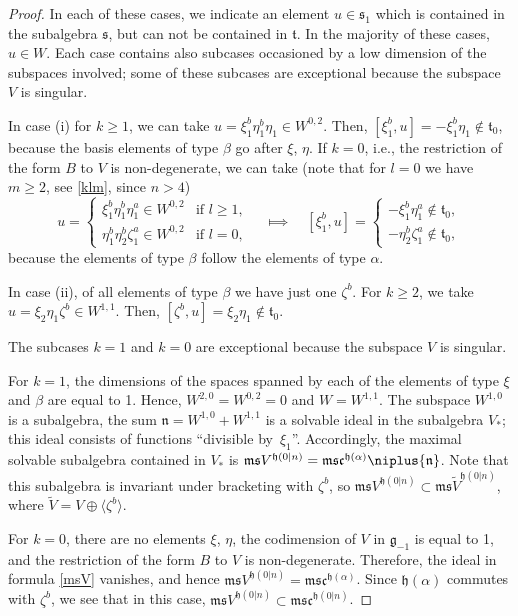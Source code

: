 \documentclass[10pt,a4paper]{amsart}
\newcommand {\fc} {{\mathfrak{c}}}
\newcommand {\fg} {{\mathfrak{g}}} %
\newcommand {\fh} {{\mathfrak{h}}}
\newcommand {\fm} {{\mathfrak{m}}}
\newcommand {\fn} {{\mathfrak{n}}}
\newcommand {\fs} {{\mathfrak{s}}}
\newcommand {\ft} {{\mathfrak{t}}}
\newcommand {\<} [2] {{\left.\vphantom{#2}\right.^{#1\!}\!{#2}}}
\numberwithin{equation}{section}
\begin{document}
\begin{proof}
In each of these cases, we indicate an element $u\in \fs_1$ which is contained in the subalgebra $\fs$, but can not be contained in $\ft$. In the majority of these cases, $u\in W$. Each case contains also subcases occasioned by a low dimension of the subspaces involved; some of these subcases are exceptional because the subspace $V$ is singular.

In case (i) for $k\ge 1$, we can take $u=\xi_1^b\eta_1^b \eta_1\in W^{0,2}$. Then, $[\xi_1^b, u]=-\xi_1^b \eta_1\notin \ft_0$, because the basis elements of type $\beta$ go after $\xi$, $\eta$. If $k=0$, i.e., the restriction of the form $B$ to $V$ is non-degenerate, we can take (note that for $l=0$ we have $m\ge 2$, see \eqref{klm}, since $n>4$){\samepage
\[
u=\begin{cases}\xi_1^b\eta_1^b \eta_1^a\in W^{0,2}&\text{if $l\ge 1$},\\
\eta_1^b\eta_2^b\zeta_1^a\in W^{0,2}&\text{if $l=0$,}
\end{cases}\quad \Longmapsto\quad [\xi_1^b, u]=\begin{cases}-\xi_1^b \eta_1^a\notin \ft_0,\\
-\eta_2^b \zeta_1^a\notin \ft_0,\end{cases}
\]
because the elements of type $\beta$ follow the elements of type $\alpha$.}

In case (ii), of all elements of type $\beta$ we have just one $\zeta^b$. For $k\ge 2$, we
 take $u=\xi_2\eta_1\zeta^b\in W^{1,1}$. Then,
$[\zeta^b, u]=\xi_2\eta_1\notin \ft_0$.

The subcases $k=1$ and $k=0$ are exceptional because the subspace $V$ is singular.

For $k=1$, the dimensions of the spaces spanned by each of the elements of type $\xi$ and $\beta$ are equal to 1. Hence, $W^{2,0}=W^{0,2}=0$ and $W=W^{1,1}$. The subspace $W^{1,0}$ is a subalgebra, the sum $\fn= W^{1,0}+W^{1,1}$ is a solvable ideal in the subalgebra $V_*$; this ideal consists of functions ``divisible by~$\xi_1$''. Accordingly, the maximal solvable subalgebra contained in $V_*$ is %
$\fm\fs V^{\fh(0|n)} =\fm\fs\fc^{\fh(\alpha)}\niplus\fn$. Note that this subalgebra is invariant under bracketing with $\zeta^b$, so $\fm\fs V^{\fh(0|n)} \subset\fm\fs \widetilde V^{\fh(0|n)}$, where $\widetilde V=V\oplus \langle\zeta^b\rangle$.

For $k=0$, there are no elements $\xi$, $\eta$, the codimension of $V$ in $\fg_{-1}$ is equal to 1, and the restriction of the form $B$ to $V$ is non-degenerate. Therefore, the ideal in formula \eqref{msV} vanishes, and hence $\fm\fs V^{\fh(0|n)}= \fm\fs\fc^{\fh(\alpha)}$. Since $\fh(\alpha)$ commutes with $\zeta^b$, we see that in this case, $\fm\fs V^{\fh(0|n)}\subset \fm\fs\fc^{\fh(0|n)}$.


\end{proof}
\end{document}
